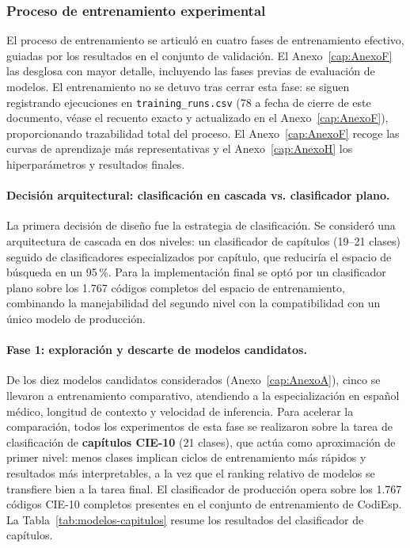 \subsubsection{Proceso de entrenamiento experimental}
\label{sec:entrenamiento}

El proceso de entrenamiento se articuló en cuatro fases de entrenamiento efectivo, guiadas por los resultados en el conjunto de validación. El Anexo~\ref{cap:AnexoF} las desglosa con mayor detalle, incluyendo las fases previas de evaluación de modelos. El entrenamiento no se detuvo tras cerrar esta fase: se siguen registrando ejecuciones en \texttt{training\_runs.csv} (78 a fecha de cierre de este documento, véase el recuento exacto y actualizado en el Anexo~\ref{cap:AnexoF}), proporcionando trazabilidad total del proceso. El Anexo~\ref{cap:AnexoF} recoge las curvas de aprendizaje más representativas y el Anexo~\ref{cap:AnexoH} los hiperparámetros y resultados finales.

\paragraph{Decisión arquitectural: clasificación en cascada vs. clasificador plano.}
La primera decisión de diseño fue la estrategia de clasificación. Se consideró una arquitectura de cascada en dos niveles: un clasificador de capítulos (19–21 clases) seguido de clasificadores especializados por capítulo, que reduciría el espacio de búsqueda en un 95\,\%. Para la implementación final se optó por un clasificador plano sobre los 1.767 códigos completos del espacio de entrenamiento, combinando la manejabilidad del segundo nivel con la compatibilidad con un único modelo de producción.

\paragraph{Fase 1: exploración y descarte de modelos candidatos.}
De los diez modelos candidatos considerados (Anexo~\ref{cap:AnexoA}), cinco se llevaron a entrenamiento comparativo, atendiendo a la especialización en español médico, longitud de contexto y velocidad de inferencia. Para acelerar la comparación, todos los experimentos de esta fase se realizaron sobre la tarea de clasificación de \textbf{capítulos CIE-10} (21 clases), que actúa como aproximación de primer nivel: menos clases implican ciclos de entrenamiento más rápidos y resultados más interpretables, a la vez que el ranking relativo de modelos se transfiere bien a la tarea final. El clasificador de producción opera sobre los 1.767 códigos CIE-10 completos presentes en el conjunto de entrenamiento de CodiEsp. La Tabla~\ref{tab:modelos-capitulos} resume los resultados del clasificador de capítulos.

